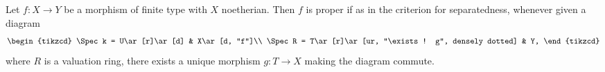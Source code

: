 Let $f\colon X\to Y$ be a morphism of finite type with $X$ noetherian. Then $f$ is
proper if as in the criterion for separatedness, whenever given a diagram
\[\begin{tikzcd}
	\Spec k = U\ar[r]\ar[d] & X\ar[d, "f"]\\
	\Spec R = T\ar[r]\ar[ur, "\exists! g", densely dotted] & Y,
\end{tikzcd}\]
where $R$ is a valuation ring, there exists a unique morphism $g\colon T\to X$
making the diagram commute.
